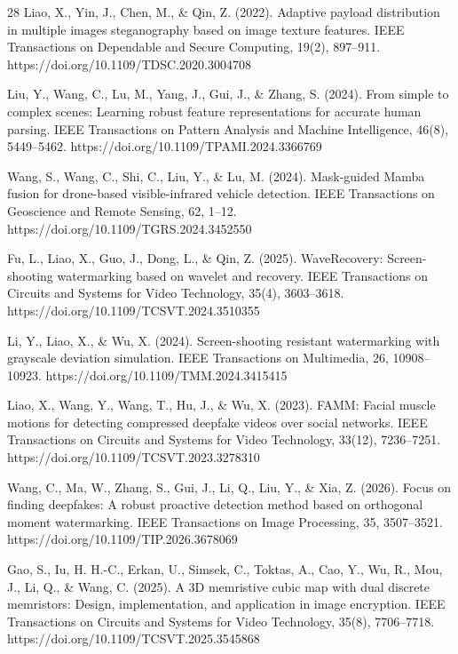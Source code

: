 \documentclass[preprint,12pt]{elsarticle}
\theoremstyle{plain}
\begin{document}
\begin{thebibliography}{28}
Liao, X., Yin, J., Chen, M., \& Qin, Z. (2022). Adaptive payload distribution in multiple images steganography based on image texture features. IEEE Transactions on Dependable and Secure Computing, 19(2), 897--911. https://doi.org/10.1109/TDSC.2020.3004708

Liu, Y., Wang, C., Lu, M., Yang, J., Gui, J., \& Zhang, S. (2024). From simple to complex scenes: Learning robust feature representations for accurate human parsing. IEEE Transactions on Pattern Analysis and Machine Intelligence, 46(8), 5449--5462. https://doi.org/10.1109/TPAMI.2024.3366769

Wang, S., Wang, C., Shi, C., Liu, Y., \& Lu, M. (2024). Mask-guided Mamba fusion for drone-based visible-infrared vehicle detection. IEEE Transactions on Geoscience and Remote Sensing, 62, 1--12. https://doi.org/10.1109/TGRS.2024.3452550

Fu, L., Liao, X., Guo, J., Dong, L., \& Qin, Z. (2025). WaveRecovery: Screen-shooting watermarking based on wavelet and recovery. IEEE Transactions on Circuits and Systems for Video Technology, 35(4), 3603--3618. https://doi.org/10.1109/TCSVT.2024.3510355

Li, Y., Liao, X., \& Wu, X. (2024). Screen-shooting resistant watermarking with grayscale deviation simulation. IEEE Transactions on Multimedia, 26, 10908--10923. https://doi.org/10.1109/TMM.2024.3415415

Liao, X., Wang, Y., Wang, T., Hu, J., \& Wu, X. (2023). FAMM: Facial muscle motions for detecting compressed deepfake videos over social networks. IEEE Transactions on Circuits and Systems for Video Technology, 33(12), 7236--7251. https://doi.org/10.1109/TCSVT.2023.3278310

Wang, C., Ma, W., Zhang, S., Gui, J., Li, Q., Liu, Y., \& Xia, Z. (2026). Focus on finding deepfakes: A robust proactive detection method based on orthogonal moment watermarking. IEEE Transactions on Image Processing, 35, 3507--3521. https://doi.org/10.1109/TIP.2026.3678069

Gao, S., Iu, H. H.-C., Erkan, U., Simsek, C., Toktas, A., Cao, Y., Wu, R., Mou, J., Li, Q., \& Wang, C. (2025). A 3D memristive cubic map with dual discrete memristors: Design, implementation, and application in image encryption. IEEE Transactions on Circuits and Systems for Video Technology, 35(8), 7706--7718. https://doi.org/10.1109/TCSVT.2025.3545868


\end{thebibliography}
\end{document}
